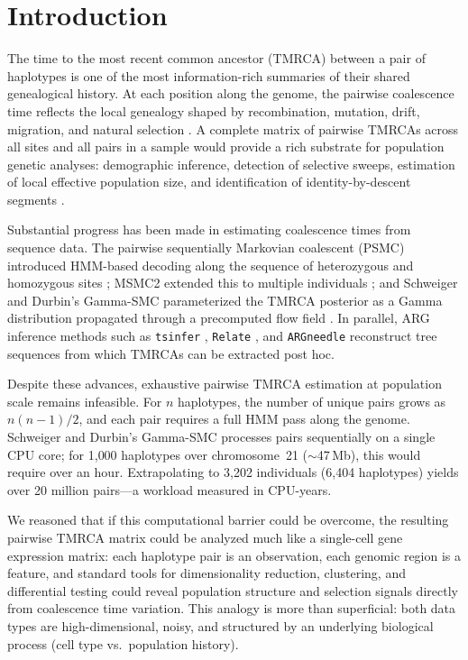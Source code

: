 \documentclass[10pt,letterpaper]{article}
\begin{document}
\section*{Introduction}

The time to the most recent common ancestor (TMRCA) between a pair of haplotypes is one of the most information-rich summaries of their shared genealogical history.
At each position along the genome, the pairwise coalescence time reflects the local genealogy shaped by recombination, mutation, drift, migration, and natural selection \cite{Li2011,Schiffels2014}.
A complete matrix of pairwise TMRCAs across all sites and all pairs in a sample would provide a rich substrate for population genetic analyses: demographic inference, detection of selective sweeps, estimation of local effective population size, and identification of identity-by-descent segments \cite{Palamara2012,Ralph2013,Kelleher2019}.

Substantial progress has been made in estimating coalescence times from sequence data.
The pairwise sequentially Markovian coalescent (PSMC) introduced HMM-based decoding along the sequence of heterozygous and homozygous sites \cite{Li2011}; MSMC2 extended this to multiple individuals \cite{Schiffels2014,Malaspinas2016}; and Schweiger and Durbin's Gamma-SMC parameterized the TMRCA posterior as a Gamma distribution propagated through a precomputed flow field \cite{Schweiger2023}.
In parallel, ARG inference methods such as \texttt{tsinfer} \cite{Kelleher2019}, \texttt{Relate} \cite{Speidel2019}, and \texttt{ARGneedle} \cite{Zhang2023} reconstruct tree sequences from which TMRCAs can be extracted post hoc.

Despite these advances, exhaustive pairwise TMRCA estimation at population scale remains infeasible.
For $n$ haplotypes, the number of unique pairs grows as $n(n-1)/2$, and each pair requires a full HMM pass along the genome.
Schweiger and Durbin's Gamma-SMC processes pairs sequentially on a single CPU core; for 1{,}000 haplotypes over chromosome~21 ($\sim$47\,Mb), this would require over an hour.
Extrapolating to 3{,}202 individuals (6{,}404 haplotypes) yields over 20 million pairs---a workload measured in CPU-years.

We reasoned that if this computational barrier could be overcome, the resulting pairwise TMRCA matrix could be analyzed much like a single-cell gene expression matrix: each haplotype pair is an observation, each genomic region is a feature, and standard tools for dimensionality reduction, clustering, and differential testing could reveal population structure and selection signals directly from coalescence time variation.
This analogy is more than superficial: both data types are high-dimensional, noisy, and structured by an underlying biological process (cell type vs.\ population history).
\end{document}
